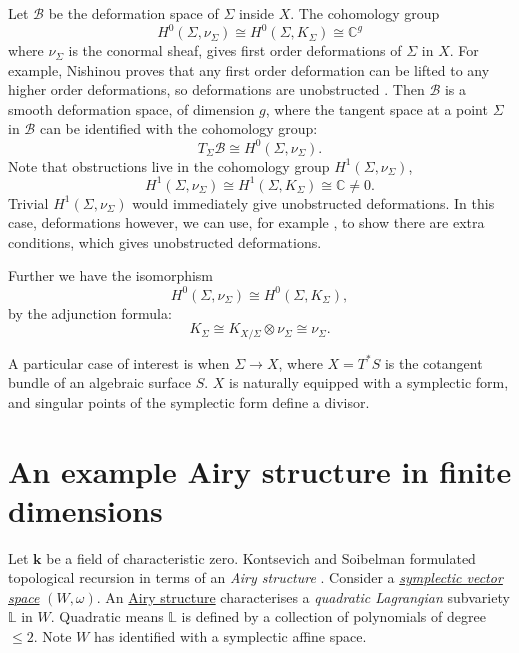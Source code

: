     
    Let \( \mathcal{B}\) be the deformation space of \( \Sigma\) inside \(X\).  The cohomology group \[ H^0(\Sigma, \nu_\Sigma) \cong H^0( \Sigma, K_\Sigma) \cong \mathbb{C}^g \]
    where \( \nu_\Sigma\) is the conormal sheaf, gives first order deformations of \(\Sigma\) in \(X\). For example, Nishinou proves that any first order deformation can be lifted to any higher order deformations, so deformations are unobstructed \cite{nishi_obs}. Then \( \mathcal{B}\) is a smooth deformation space, of dimension \(g\), where the tangent space at a point \(\Sigma\) in \( \mathcal{B}\) can be identified with the cohomology group:
    \[T_\Sigma \mathcal{B} \cong H^0(\Sigma, \nu_\Sigma).\]
    Note that obstructions live in the cohomology group \(H^1(\Sigma, \nu_\Sigma)\),
    \[ H^1( \Sigma ,\nu_\Sigma) \cong H^1(\Sigma, K_\Sigma) \cong \mathbb{C} \neq 0. \]
    Trivial \(H^1(\Sigma ,\nu_\Sigma)\) would immediately give unobstructed deformations. In this case, deformations however, we can use, for example \cite{nishi_obs}, to show there are extra conditions, which gives unobstructed deformations.
        
    Further we have the isomorphism 
    \[  H^0(\Sigma, \nu_\Sigma) \cong H^{0}(\Sigma, K_\Sigma),\] 
    by the adjunction formula:
    \[ K_\Sigma \cong K_{X/\Sigma} \otimes \nu_\Sigma \cong \nu_\Sigma. \]
    
    A particular case of interest is when \(\Sigma \rightarrow  X\), where \(X = T^{*}S\) is the cotangent bundle of an algebraic surface \(S\). \(X\) is naturally equipped with a symplectic form, and singular points of the symplectic form define a divisor.



    
    \section{An example Airy structure in finite dimensions}
    \label{sec:finiteexintro}
    Let \( \mathbf{k}\) be a field of characteristic zero. Kontsevich and Soibelman formulated topological recursion in terms of an \emph{Airy structure} \cite{ks_airy, abcd, airy_semisimple, eynard_abc}. Consider a \emph{\hyperref[defn:symplectic]{symplectic vector space}} \((W,\omega)\). An \hyperref[defn:airystruct]{Airy structure} characterises a \emph{quadratic Lagrangian} subvariety \(\mathbb{L}\) in \(W\). Quadratic means \( \mathbb{L}\) is defined by a collection of polynomials of degree \(\leq 2\). Note \(W\) has identified with a symplectic affine space.
    
